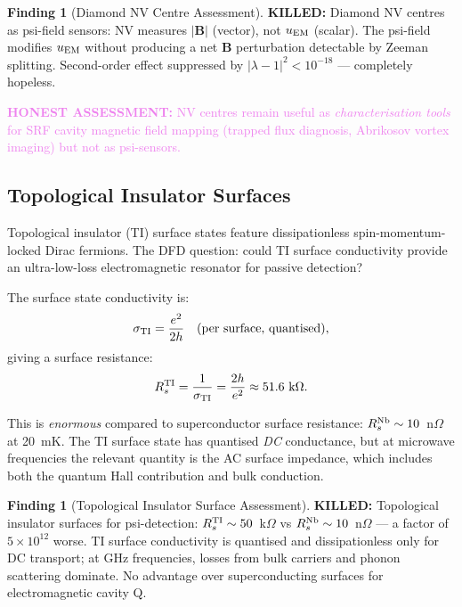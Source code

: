 \documentclass[11pt]{article}
\theoremstyle{definition}
\newtheorem{finding}[theorem]{Finding}
\theoremstyle{remark}
\newcommand{\ee}[1]{\times 10^{#1}}
\newcommand{\lam}{|\lambda-1|}
\newcommand{\honest}[1]{\textcolor{violet}{\textbf{HONEST ASSESSMENT:} #1}}
\newcommand{\killed}[1]{\textcolor{red!70!black}{\textbf{KILLED:} #1}}
\begin{document}
\begin{finding}[Diamond NV Centre Assessment]
\label{find:nv}
\killed{Diamond NV centres as psi-field sensors: NV measures
$|\mathbf{B}|$ (vector), not $u_{\rm EM}$ (scalar). The psi-field
modifies $u_{\rm EM}$ without producing a net $\mathbf{B}$ perturbation
detectable by Zeeman splitting. Second-order effect suppressed by
$\lam^2 < 10^{-18}$ --- completely hopeless.}

\honest{NV centres remain useful as \textit{characterisation tools}
for SRF cavity magnetic field mapping (trapped flux diagnosis,
Abrikosov vortex imaging) but not as psi-sensors.}
\end{finding}

\subsection{Topological Insulator Surfaces}

Topological insulator (TI) surface states feature dissipationless
spin-momentum-locked Dirac fermions. The DFD question: could
TI surface conductivity provide an ultra-low-loss electromagnetic
resonator for passive detection?

The surface state conductivity is:
\begin{equation}
\sigma_{\rm TI} = \frac{e^2}{2h} \quad \text{(per surface, quantised)},
\label{eq:ti_conductivity}
\end{equation}
giving a surface resistance:
\begin{equation}
R_s^{\rm TI} = \frac{1}{\sigma_{\rm TI}}
= \frac{2h}{e^2} \approx 51.6~\text{k}\Omega.
\label{eq:ti_rs}
\end{equation}

This is \textit{enormous} compared to superconductor surface
resistance: $R_s^{\rm Nb} \sim 10$~n$\Omega$ at 20~mK. The TI
surface state has quantised \textit{DC} conductance, but at
microwave frequencies the relevant quantity is the AC surface
impedance, which includes both the quantum Hall contribution and
bulk conduction.

\begin{finding}[Topological Insulator Surface Assessment]
\label{find:ti}
\killed{Topological insulator surfaces for psi-detection:
$R_s^{\rm TI} \sim 50$~k$\Omega$ vs $R_s^{\rm Nb} \sim 10$~n$\Omega$
--- a factor of $5\ee{12}$ worse. TI surface conductivity is
quantised and dissipationless only for DC transport; at GHz
frequencies, losses from bulk carriers and phonon scattering dominate.
No advantage over superconducting surfaces for electromagnetic
cavity Q.}
\end{finding}
\end{document}
